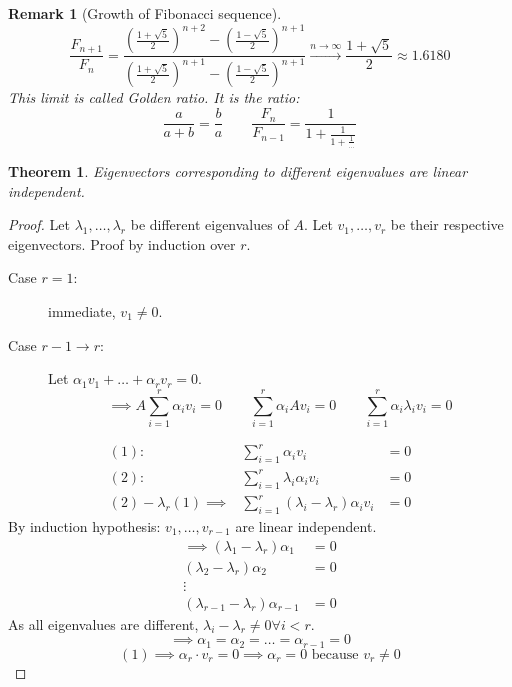 \documentclass[a4paper]{article}
\newcounter{lecref}[section]
\numberwithin{lecref}{section}
\newtheorem{theorem}[lecref]{Theorem}
\newtheorem*{Remark}{Remark}
\begin{document}
\begin{Remark}[Growth of Fibonacci sequence]
  \[ \frac{F_{n+1}}{F_n} = \frac{\left(\frac{1 + \sqrt5}{2}\right)^{n+2} - \left(\frac{1 - \sqrt5}{2}\right)^{n+1}}{\left(\frac{1 + \sqrt5}{2}\right)^{n+1} - \left(\frac{1 - \sqrt5}{2}\right)^{n+1}} \xrightarrow{n\to\infty} \frac{1 + \sqrt5}{2} \approx 1.6180 \]
  This limit is called \emph{Golden ratio}. It is the ratio:
  \[ \frac{a}{a+b} = \frac ba \qquad \frac{F_n}{F_{n-1}} = \frac{1}{1 + \frac{1}{1 + \frac{1}{\dots}}} \]
\end{Remark}

\begin{theorem} %
  Eigenvectors corresponding to different eigenvalues are linear independent.
\end{theorem}

\begin{proof}
  Let $\lambda_1, \dots, \lambda_r$ be different eigenvalues of $A$. Let $v_1, \dots, v_r$ be their respective eigenvectors. Proof by induction over $r$.
  \begin{description}
    \item[Case $r=1$:]  immediate, $v_1 \neq 0$.
    \item[Case $r-1 \to r$:]
      Let $\alpha_1 v_1 + \dots + \alpha_r v_r = 0$.
      \[ \implies A \sum_{i=1}^r \alpha_i v_i = 0 \qquad
         \sum_{i=1}^r \alpha_i A v_i = 0 \qquad
         \sum_{i=1}^r \alpha_i \lambda_i v_i = 0 \]
  \end{description}

  \[ \begin{array}{rrl}
    (1): & \sum_{i=1}^{r} \alpha_i v_i &= 0 \\
    (2): & \sum_{i=1}^{r} \lambda_i \alpha_i v_i &= 0 \\
    \hline
    (2) - \lambda_r (1) \implies & \sum_{i=1}^{r} (\lambda_i - \lambda_r) \alpha_i v_i &= 0
  \end{array} \]
  By induction hypothesis: $v_1, \dots, v_{r-1}$ are linear independent.
  \begin{align*}
    \implies (\lambda_1 - \lambda_r) \alpha_1 &= 0 \\
    (\lambda_2 - \lambda_r) \alpha_2 &= 0 \\
    \vdots & \\
    (\lambda_{r-1} - \lambda_r) \alpha_{r-1} &= 0
  \end{align*}
  As all eigenvalues are different, $\lambda_i - \lambda_r \neq 0 \forall i < r$.
  \[ \implies \alpha_1 = \alpha_2 = \dots = \alpha_{r-1} = 0 \]
  \[ (1) \implies \alpha_r \cdot v_r = 0 \implies \alpha_r = 0 \text{ because } v_r \neq 0 \]
\end{proof}
\end{document}
